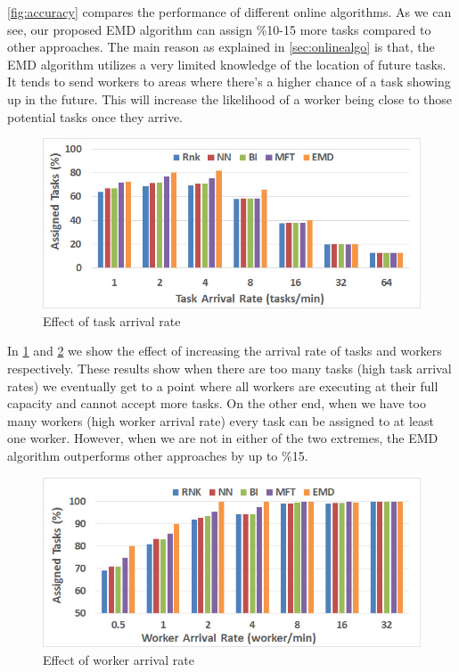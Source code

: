 \cref{fig:accuracy} compares the performance of different online algorithms. As we can see, our proposed EMD algorithm can assign \%10-15 more tasks compared to other approaches. The main reason as explained in \cref{sec:onlinealgo} is that, the EMD algorithm utilizes a very limited knowledge of the location of future tasks. It tends to send workers to areas where there's a higher chance of a task showing up in the future. This will increase the likelihood of a worker being close to those potential tasks once they arrive.

\begin{figure}[h]
	\centering
	\includegraphics[width = 0.9\columnwidth]{figures/accuracy_trate.jpg}
	\vspace{-0.1in}
	\caption{Effect of task arrival rate}\label{fig:trate}
\end{figure}

In \cref{fig:trate} and \cref{fig:wrate} we show the effect of increasing the arrival rate of tasks and workers respectively. These results show when there are too many tasks (high task arrival rates) we eventually get to a point where all workers are executing at their full capacity and cannot accept more tasks. On the other end, when we have too many workers (high worker arrival rate) every task can be assigned to at least one worker. However, when we are not in either of the two extremes, the EMD algorithm outperforms other approaches by up to \%15.

\begin{figure}[h]
	\centering
	\includegraphics[width = 0.9\columnwidth]{figures/accuracy_wrate.jpg}
	\vspace{-0.1in}
	\caption{Effect of worker arrival rate}\label{fig:wrate}
\end{figure}

